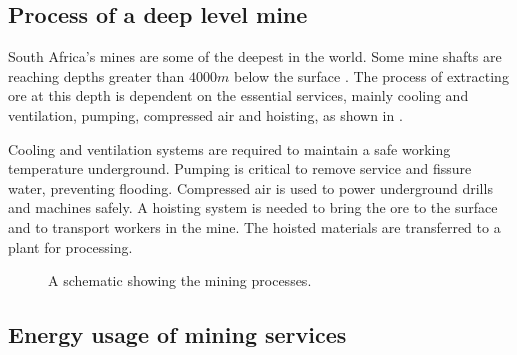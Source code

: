 	\subsection{Process of a deep level mine}
	South Africa's mines are some of the deepest in the world. Some mine shafts are reaching depths greater than $4000m$ below the surface \cite{vosloo2012case}. The process of extracting ore at this depth is dependent on the essential services, mainly cooling and ventilation, pumping, compressed air and hoisting, as shown in .
	\par 
	 Cooling and ventilation systems are required to maintain a safe working temperature underground. Pumping is critical to remove service and fissure water, preventing flooding. Compressed air is used to power underground drills and machines safely. A hoisting system is needed to bring the ore to the surface and to transport workers in the mine. The hoisted materials are transferred to a plant for processing.  
		\begin{figure}[h!]
			\centering
			\caption{A schematic showing the mining processes.}
			\label{fig: Mining Layout}
		\end{figure}
		\subsection{Energy usage of mining services}
		
